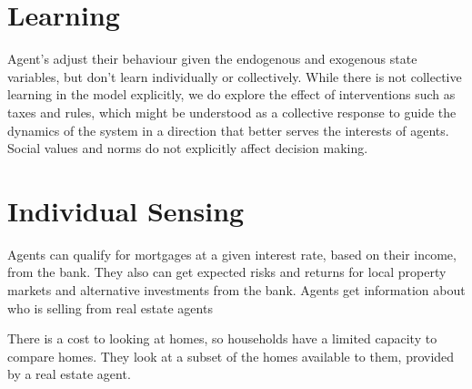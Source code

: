 \section*{Learning}

Agent's adjust their behaviour given the endogenous and exogenous state variables, but don't learn individually or collectively. %
While there is not collective learning in the model explicitly, we do explore the effect of interventions such as taxes and rules, which might be understood as a collective response to guide the dynamics of the system in a direction that better serves the interests of agents. 
Social values and norms do not explicitly affect decision making. %


\section*{Individual Sensing}

Agents can qualify for mortgages at a given interest rate, based on their income, from the bank. 
They also can get expected risks and returns for local property markets and alternative investments from the bank. %
Agents get information about who is selling from real estate agents

There is a cost to looking at homes, so households have a limited capacity to compare homes. They look at a subset of the homes available to them, provided by a real estate agent. %


